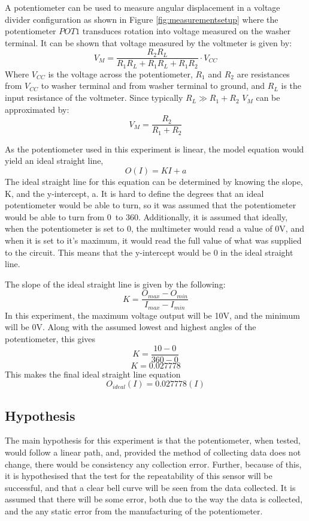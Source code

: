 \documentclass[a4,11pt]{article}
\begin{document}
A potentiometer can be used to  measure angular displacement in a
voltage divider configuration as shown in Figure \ref{fig:measurementsetup} where the potentiometer $POT1$ transduces rotation into voltage measured on the
washer terminal. It can be shown that voltage measured by the voltmeter is given by:
$$V_{M}=\frac{R_2R_L}{R_1R_L+R_1R_L+R_1R_2}\cdot V_{CC}$$
Where $V_{CC}$ is the voltage across the potentiometer, $R_1$ and $R_2$ are resistances from $V_{CC}$ to washer terminal and from washer terminal to ground, and $R_L$ is the input resistance of the voltmeter. Since typically $R_L\gg R_1+R_2$ $V_M$ can be approximated by:
$$V_{M}=\frac{R_2}{R_1+R_2}$$

As the potentiometer used in this experiment is linear, the model equation would yield an ideal straight line,
$$O(I)=KI+a$$
The ideal straight line for this equation can be determined by knowing the slope, K, and the y-intercept, a. It is hard to define the degrees that an ideal potentiometer would be able to turn, so it was assumed that the potentiometer would be able to turn from 0\degree\ to 360\degree. Additionally, it is assumed that ideally, when the potentiometer is set to 0\degree, the multimeter would read a value of 0V, and when it is set to it's maximum, it would read the full value of what was supplied to the circuit. This means that the y-intercept would be 0 in the ideal straight line.

The slope of the ideal straight line is given by the following:
$$K=\frac{O_{max}-O_{min}}{I_{max}-I_{min}}$$
In this experiment, the maximum voltage output will be 10V, and the minimum will be 0V. Along with the assumed lowest and highest angles of the potentiometer, this gives
$$K=\frac{10-0}{360-0}$$
$$K=0.027778$$
This makes the final ideal straight line equation
$$O_{ideal}(I)=0.027778(I)$$
\subsection{Hypothesis}
The main hypothesis for this experiment is that the potentiometer, when tested, would follow a linear path, and, provided the method of collecting data does not change, there would be consistency any collection error. Further, because of this, it is hypothesised that the test for the repeatability of this sensor will be successful, and that a clear bell curve will be seen from the data collected. It is assumed that there will be some error, both due to the way the data is collected, and the any static error from the manufacturing of the potentiometer.
\end{document}
